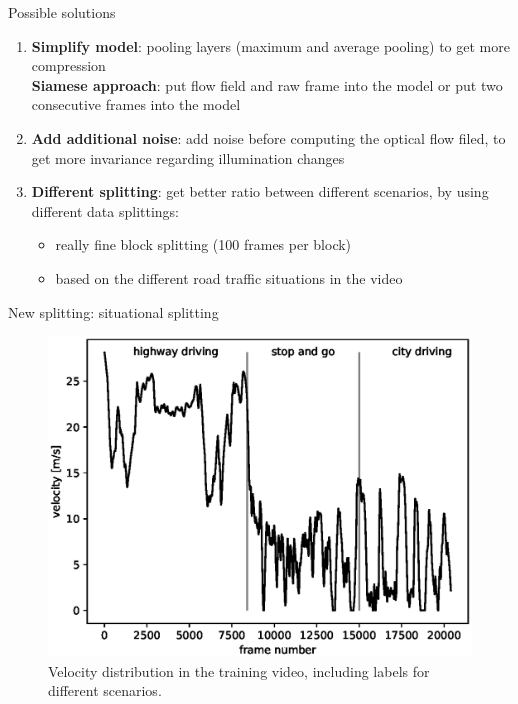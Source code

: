 \begin{frame}{Possible solutions}
\begin{enumerate}
\item \textbf{Simplify model}: pooling layers (maximum and average pooling) to get more compression\\
\textbf{Siamese approach}: put flow field and raw frame into the model or put two consecutive frames into the model
\item \textbf{Add additional noise}: add noise before computing the optical flow filed, to get more invariance regarding illumination changes
\item \textbf{Different splitting}: get better ratio between different scenarios, by using different data splittings:
\begin{itemize}
\item really fine block splitting (100 frames per block)
\item based on the different road traffic situations in the video
\end{itemize}
\end{enumerate}
\end{frame}

\begin{frame}{New splitting: situational splitting}
\begin{figure}
\centering
\includegraphics[scale=0.5]{./imgs/plot_speed_time_new_splitting.eps}
\caption{Velocity distribution in the training video, including labels for different scenarios.}
\end{figure}
\end{frame}

